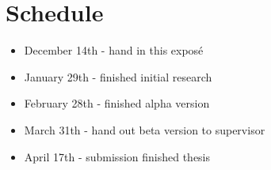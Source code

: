 \section*{Schedule}

\begin{itemize}
	\item December 14th - hand in this exposé
	\item January 29th - finished initial research
	\item February 28th - finished alpha version
	\item March 31th - hand out beta version to supervisor
	\item April 17th - submission finished thesis
\end{itemize}